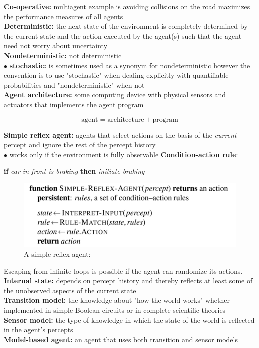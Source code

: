     \textbf{Co-operative:} multiagent example is avoiding collisions on the road maximizes the performance measures of all agents \\
    \textbf{Deterministic:} the next state of the environment is completely determined by the current state and the action executed by the agent(s) such that the agent need not worry about uncertainty \\
    \textbf{Nondeterministic:} not deterministic \\
    $\bullet$ \textbf{stochastic:} is sometimes used as a synonym for nondeterministic however the convention is to use "stochastic" when dealing explicitly with quantifiable probabilities and "nondeterministic" when
    not \\
    \textbf{Agent architecture:} some computing device with physical sensors and actuators that implements the agent program

    \[
        \text{agent} = \text{architecture} + \text{program}
    \]

    \textbf{Simple reflex agent:} agents that select actions on the basis of the \textit{current} percept and ignore the rest of the percept history \\
    $\bullet$ works only if the environment is fully observable
    \textbf{Condition-action rule}:

    \begin{center}
        \textbf{if} \textit{car-in-front-is-braking} \textbf{then} \textit{initiate-braking}
    \end{center}

    \begin{figure}[hbt!]
        \centering
        \caption*{A simple reflex agent:}
        \includegraphics[scale = 0.75]{Assets/Single_Reflex_Agent}
    \end{figure}

    Escaping from infinite loops is possible if the agent can randomize its actions. \\
    \textbf{Internal state:} depends on percept history and thereby reflects at least some of the unobserved aspects of the current state \\
    \textbf{Transition model:} the knowledge about "how the world works" whether implemented in simple Boolean circuits or in complete scientific theories \\
    \textbf{Sensor model:} the type of knowledge in which the state of the world is reflected in the agent's percepts \\
    \textbf{Model-based agent:} an agent that uses both transition and sensor models \\

